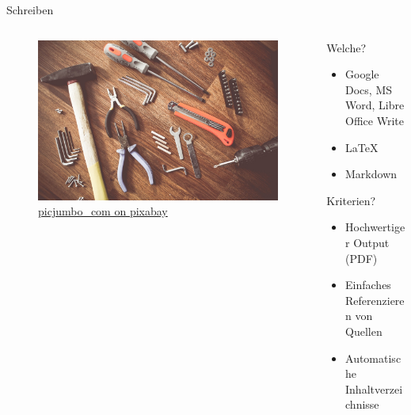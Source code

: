 \begin{frame}[t]{Schreiben}
    \begin{columns}[t]
        \begin{column}{0.29\textwidth}      
            \vspace{-3em} 
            \begin{figure}[t]
                \begin{flushleft}
                    \includegraphics[height=0.8\textheight,trim={0 0 25cm 0},clip]{graphics/tools-864983_1280.jpg}         
                    \caption*{\href{https://pixabay.com/de/photos/werkzeuge-konstruieren-boot-864983/}{picjumbo\_com on pixabay}}    
                \end{flushleft}                
                      
            \end{figure}
        \end{column}        
        \begin{column}{0.7\textwidth}
            Welche?
            \begin{itemize}[]
                \item Google Docs, MS Word, Libre Office Write
                \item \LaTeX
                \item Markdown
            \end{itemize}
            Kriterien?
            \begin{itemize}[]
                \item Hochwertiger Output (PDF)
                \item Einfaches Referenzieren von Quellen
                \item Automatische Inhaltverzeichnisse
            \end{itemize}
        \end{column}
    \end{columns}
\end{frame}

